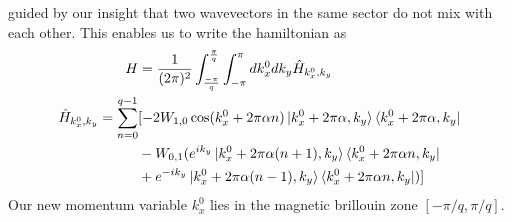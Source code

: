 guided by our insight that two wavevectors in the same sector do not mix with each other. This enables us to write the hamiltonian as \cite{bernevig2013topological}
\begin{align}
 H &= \frac{1}{(2\pi)^2}\int_{\frac{-\pi}{q}}^{\frac{\pi}{q}}\int_{-\pi}^{\pi}{dk_{x}^{0}dk_{y} \hat{H}_{k_x^0,k_y}} \\
 \hat{H}_{k_x^0,k_y} = \sum_{n=0}^{q-1} &[-2W_{1,0}\cos(k_{x}^{0} + 2\pi\alpha n)\ket{k_x^{0}+2\pi\alpha,k_y}\bra{k_x^{0}+2\pi\alpha,k_y} \nonumber \\
 &- W_{0,1}(e^{ik_y}\ket{k_x^{0}+2\pi\alpha(n+1),k_y}\bra{k_x^{0}+2\pi\alpha n,k_y} \nonumber \\
 &+ e^{-ik_y}\ket{k_x^{0}+2\pi\alpha(n-1),k_y}\bra{k_x^{0}+2\pi\alpha n,k_y})] 
\end{align} Our new momentum variable $k_{x}^0$ lies in the magnetic brillouin zone $[-\pi/q, \pi/q]$.

